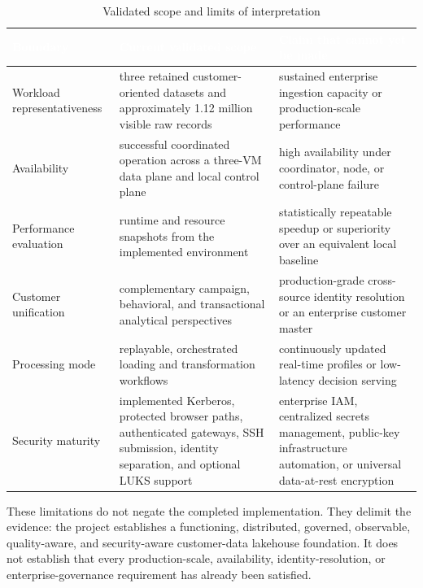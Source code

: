 \begin{table}[!htbp]
    \centering
    \footnotesize
    \renewcommand{\arraystretch}{1.14}
    \begin{tabularx}{\textwidth}{|L{0.23\textwidth}|Y|Y|}
        \hline
        \textcolor{white}{\textbf{Boundary}} & \textcolor{white}{\textbf{Current validated scope}} & \textcolor{white}{\textbf{Claim that cannot yet be made}} \\
        \hline
        Workload representativeness & three retained customer-oriented datasets and approximately 1.12 million visible raw records & sustained enterprise ingestion capacity or production-scale performance \\
        \hline
        Availability & successful coordinated operation across a three-VM data plane and local control plane & high availability under coordinator, node, or control-plane failure \\
        \hline
        Performance evaluation & runtime and resource snapshots from the implemented environment & statistically repeatable speedup or superiority over an equivalent local baseline \\
        \hline
        Customer unification & complementary campaign, behavioral, and transactional analytical perspectives & production-grade cross-source identity resolution or an enterprise customer master \\
        \hline
        Processing mode & replayable, orchestrated loading and transformation workflows & continuously updated real-time profiles or low-latency decision serving \\
        \hline
        Security maturity & implemented Kerberos, protected browser paths, authenticated gateways, SSH submission, identity separation, and optional LUKS support & enterprise IAM, centralized secrets management, public-key infrastructure automation, or universal data-at-rest encryption \\
        \hline
    \end{tabularx}
    \caption{Validated scope and limits of interpretation}
    \label{tab:chapter9-validity-boundaries}
\end{table}
\FloatBarrier

\clearpage
These limitations do not negate the completed implementation. They delimit the evidence: the project establishes a functioning, distributed, governed, observable, quality-aware, and security-aware customer-data lakehouse foundation. It does not establish that every production-scale, availability, identity-resolution, or enterprise-governance requirement has already been satisfied.


